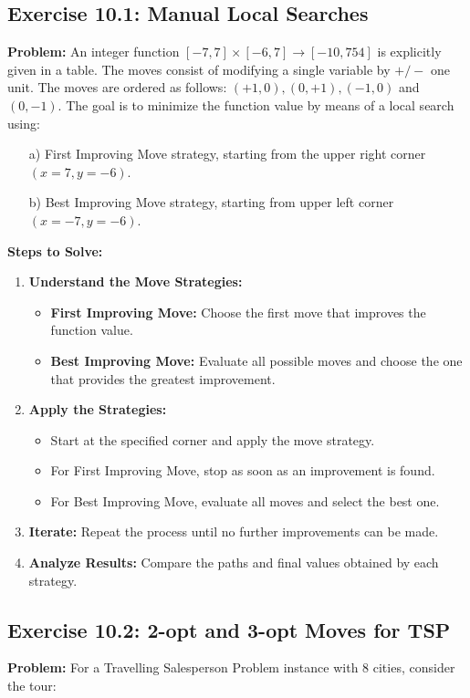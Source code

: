 \subsection{Exercise 10.1: Manual Local Searches}
\textbf{Problem:}
An integer function \([-7, 7] \times [-6, 7] \to [-10, 754]\) is explicitly given in a table. The moves consist of modifying a single variable by \(+/-\) one unit. The moves are ordered as follows: \((+1, 0), (0, +1), (-1, 0)\) and \((0, -1)\). The goal is to minimize the function value by means of a local search using:
\begin{enumerate}
\item[a)] First Improving Move strategy, starting from the upper right corner \((x=7, y=-6)\).
\item[b)] Best Improving Move strategy, starting from upper left corner \((x=-7, y=-6)\).
\end{enumerate}

\textbf{Steps to Solve:}
\begin{enumerate}
\item \textbf{Understand the Move Strategies:}
  \begin{itemize}
  \item \textbf{First Improving Move:} Choose the first move that improves the function value.
  \item \textbf{Best Improving Move:} Evaluate all possible moves and choose the one that provides the greatest improvement.
  \end{itemize}
\item \textbf{Apply the Strategies:}
  \begin{itemize}
  \item Start at the specified corner and apply the move strategy.
  \item For First Improving Move, stop as soon as an improvement is found.
  \item For Best Improving Move, evaluate all moves and select the best one.
  \end{itemize}
\item \textbf{Iterate:} Repeat the process until no further improvements can be made.
\item \textbf{Analyze Results:} Compare the paths and final values obtained by each strategy.
\end{enumerate}

\subsection{Exercise 10.2: 2-opt and 3-opt Moves for TSP}
\textbf{Problem:}
For a Travelling Salesperson Problem instance with 8 cities, consider the tour:

